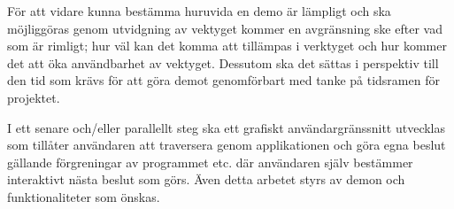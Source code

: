 För att vidare kunna bestämma huruvida en demo är lämpligt och ska möjliggöras
genom utvidgning av vektyget kommer en avgränsning ske efter vad som är
rimligt; hur väl kan det komma att tillämpas i verktyget och hur kommer det att
öka användbarhet av vektyget. Dessutom ska det sättas i perspektiv till den tid
som krävs för att göra demot genomförbart med tanke på tidsramen för projektet.

I ett senare och/eller parallellt steg ska ett grafiskt användargränssnitt
utvecklas som tillåter användaren att traversera genom applikationen och göra
egna beslut gällande förgreningar av programmet etc. där användaren själv
bestämmer interaktivt nästa beslut som görs. Även detta arbetet styrs av demon
och funktionaliteter som önskas.




%  

